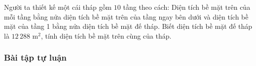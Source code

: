 \begin{vd}[VD]%
	Người ta thiết kế một cái tháp gồm $10$ tầng theo cách: Diện tích bề mặt trên của mỗi tầng bằng nửa diện tích bề mặt trên của tầng ngay bên dưới và diện tích bề mặt của tầng 1 bằng nửa diện tích bề mặt đế tháp. Biết diện tích bề mặt đế tháp là $12\, 288$ m$^2$, tính diện tích bề mặt trên cùng của tháp.
\end{vd}
\subsubsection{Bài tập tự luận}
 
